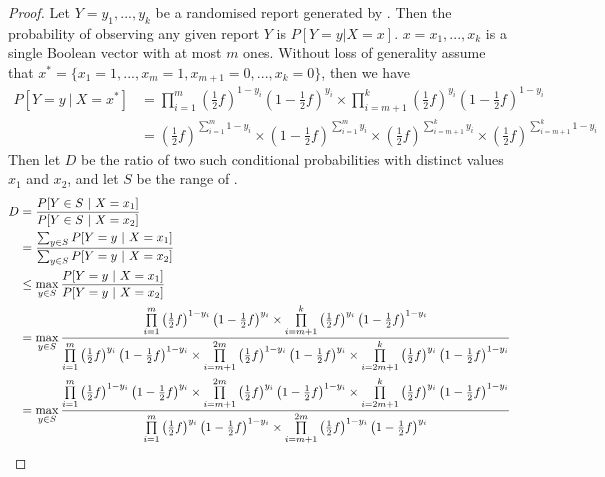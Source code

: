 \documentclass{article}
\begin{document}
\begin{proof}
	Let $Y=y_1,...,y_k$ be a randomised report generated by . Then the probability of observing any given report $Y$ is $P[Y=y | X=x]$. $x=x_1,...,x_k$ is a single Boolean vector with at most $m$ ones. 
	Without loss of generality assume that $x^*=\{x_1=1,...,x_m=1,x_{m+1}=0,...,x_k=0\}$, then we have
	\begin{align}
		P[Y=y~|~X=x^*] &=%
			\prod\limits_{i=1}^m \left(\frac{1}{2}f\right)^{1-y_i}\left(1-\frac{1}{2}f\right)^{y_i}%
			\times \prod\limits_{i=m+1}^k\left(\frac{1}{2}f\right)^{y_i} \left(1-\frac{1}{2}f\right)^{1-y_i}\\
	&= \left(\frac{1}{2}f\right)^{\sum_{i=1}^m 1-y_i}%
		\times \left(1-\frac{1}{2}f\right)^{\sum_{i=1}^m y_i}%
		\times \left(\frac{1}{2}f\right)^{\sum_{i=m+1}^k y_i}%
		\times \left(\frac{1}{2}f\right)^{\sum_{i=m+1}^k 1-y_i}
	\end{align}
	Then let $D$ be the ratio of two such conditional probabilities with distinct values $x_1$ and $x_2$, and let $S$ be the range of .
	\begin{align}
		D &= \frac{P[Y\in S~|~X=x_1]}{P[Y\in S~|~X=x_2]}\\
			&= \frac{\sum_{y\in S}P[Y=y~|~X=x_1]}{\sum_{y\in S}P[Y=y~|~X=x_2]}\\
			&\leq \max_{y\in S}\frac{P[Y=y~|~X=x_1]}{P[Y=y~|~X=x_2]}\\
			&=\max_{y\in S}\frac{%
				\prod\limits_{i=1}^m \left(\frac{1}{2}f\right)^{1-y_i}\left(1-\frac{1}{2}f\right)^{y_i}%
				\times \prod\limits_{i=m+1}^k\left(\frac{1}{2}f\right)^{y_i} \left(1-\frac{1}{2}f\right)^{1-y_i}
			}{%
				\prod\limits_{i=1}^m \left(\frac{1}{2}f\right)^{y_i}\left(1-\frac{1}{2}f\right)^{1-y_i}%
				\times \prod\limits_{i=m+1}^{2m}\left(\frac{1}{2}f\right)^{1-y_i} \left(1-\frac{1}{2}f\right)^{y_i}\times%
				\prod\limits_{i=2m+1}^{k}\left(\frac{1}{2}f\right)^{y_i}\left(1-\frac{1}{2}f\right)^{1-y_i}
			}\\
			&=\max_{y\in S}\frac{%
				\prod\limits_{i=1}^m \left(\frac{1}{2}f\right)^{1-y_i}\left(1-\frac{1}{2}f\right)^{y_i}%
				\times \prod\limits_{i=m+1}^{2m}\left(\frac{1}{2}f\right)^{y_i} \left(1-\frac{1}{2}f\right)^{1-y_i}%
				\times \prod\limits_{i=2m+1}^{k}\left(\frac{1}{2}f\right)^{y_i} \left(1-\frac{1}{2}f\right)^{1-y_i}
			}{%
				\prod\limits_{i=1}^m \left(\frac{1}{2}f\right)^{y_i}\left(1-\frac{1}{2}f\right)^{1-y_i}%
				\times \prod\limits_{i=m+1}^{2m}\left(\frac{1}{2}f\right)^{1-y_i} \left(1-\frac{1}{2}f\right)^{y_i}%
}
\end{align}
\end{proof}
\end{document}
